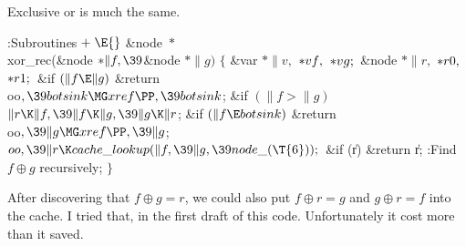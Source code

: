 Exclusive or is much the same.

\Y\B\4:Subroutines\X${}\mathrel+\E{}$\6
\&{node} ${}{*}{}$\\{xor\_rec}(\&{node} ${}{*}\|f,\39{}$\&{node} ${}{*}\|g){}$%
\1\1\2\2\6
${}\{{}$\1\6
\&{var} ${}{*}\|v,{}$ ${}{*}\\{vf},{}$ ${}{*}\\{vg};{}$\6
\&{node} ${}{*}\|r,{}$ ${}{*}\\{r0},{}$ ${}{*}\\{r1};{}$\7
\&{if} ${}(\|f\E\|g){}$\1\5
\&{return} \\{oo}${},\39\\{botsink}\MG\\{xref}\PP,\39\\{botsink}{}$;\2\6
\&{if} ${}(\|f>\|g){}$\1\5
${}\|r\K\|f,\39\|f\K\|g,\39\|g\K\|r{}$;\2\6
\&{if} ${}(\|f\E\\{botsink}){}$\1\5
\&{return} \\{oo}${},\39\|g\MG\\{xref}\PP,\39\|g{}$;\2\6
${}\\{oo},\39\|r\K\\{cache\_lookup}(\|f,\39\|g,\39\\{node\_}(\T{6}));{}$\6
\&{if} (\|r)\1\5
\&{return} \|r;\2\6
:Find $f\oplus g$ recursively\X;\6
\4${}\}{}$\2\par
\fi

After discovering that $f\oplus g=r$, we could also put $f\oplus r=g$ and
$g\oplus r=f$ into the cache. I tried that, in the first draft of this code.
Unfortunately it cost more than it saved.

